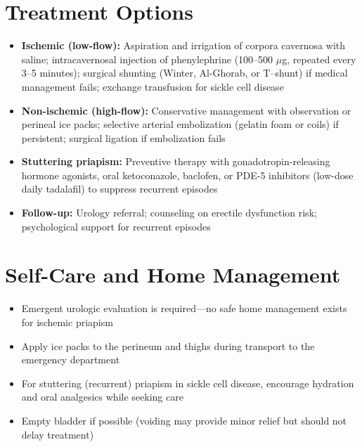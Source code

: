 \section*{Treatment Options}
\begin{itemize}
  \item \textbf{Ischemic (low-flow):} Aspiration and irrigation of corpora cavernosa with saline; intracavernosal injection of phenylephrine (100--500 \(\mu\)g, repeated every 3--5 minutes); surgical shunting (Winter, Al-Ghorab, or T--shunt) if medical management fails; exchange transfusion for sickle cell disease
  \item \textbf{Non-ischemic (high-flow):} Conservative management with observation or perineal ice packs; selective arterial embolization (gelatin foam or coils) if persistent; surgical ligation if embolization fails
  \item \textbf{Stuttering priapism:} Preventive therapy with gonadotropin-releasing hormone agonists, oral ketoconazole, baclofen, or PDE-5 inhibitors (low-dose daily tadalafil) to suppress recurrent episodes
  \item \textbf{Follow-up:} Urology referral; counseling on erectile dysfunction risk; psychological support for recurrent episodes
\end{itemize}

\section*{Self-Care and Home Management}
\begin{itemize}
  \item Emergent urologic evaluation is required---no safe home management exists for ischemic priapism
  \item Apply ice packs to the perineum and thighs during transport to the emergency department
  \item For stuttering (recurrent) priapism in sickle cell disease, encourage hydration and oral analgesics while seeking care
  \item Empty bladder if possible (voiding may provide minor relief but should not delay treatment)
\end{itemize}

